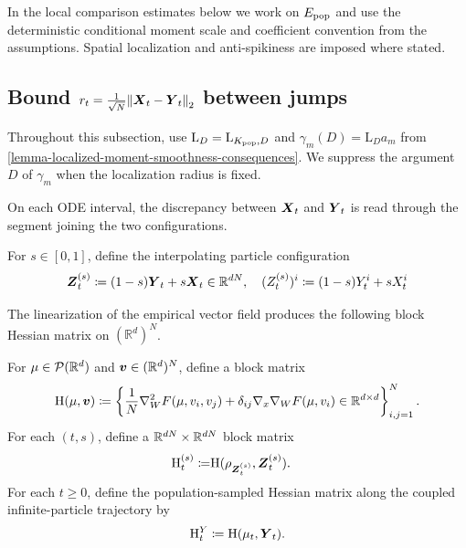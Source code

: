 

In the local comparison estimates below we work on $E_{\rm pop}$ and use the deterministic conditional moment scale and coefficient convention from the assumptions. Spatial localization and anti-spikiness are imposed where stated.

\subsection{Bound $r_t = \frac{1}{\sqrt{N}}\norm{\boldsymbol{X}_t-\boldsymbol{Y}_t}_{2}$ between jumps}
\label{subsec:general-argument-bound-r_t-ode-continuous}

Throughout this subsection, use $\mathrm L_D=\mathrm L_{K_{\rm pop},D}$
and $\gamma_m(D)=\mathrm L_Da_m$ from
\cref{lemma-localized-moment-smoothness-consequences}. We suppress the
argument $D$ of $\gamma_m$ when the localization radius is fixed.

On each ODE interval, the discrepancy between \(\boldsymbol{X}_t\) and \(\boldsymbol{Y}_t\) is read through the segment joining the two configurations.

For $s\in[0,1]$, define the interpolating particle configuration
\begin{equation}
    \boldsymbol{Z}_t^{(s)} \coloneq (1-s)\boldsymbol{Y}_t + s\boldsymbol{X}_t \in \mathbb{R}^{dN},\quad (Z_t^{(s)})^i \coloneq (1-s)Y_t^i + sX_t^i 
\end{equation}

The linearization of the empirical vector field produces the following block Hessian matrix on \((\mathbb R^d)^N\).

For $\mu \in \mathcal{P}(\mathbb{R}^d)$ and $\boldsymbol{v} \in (\mathbb{R}^{d})^{N}$, define a block matrix
\begin{equation}
    \mathrm{H}(\mu,\boldsymbol{v})\coloneq
    \left\{
    \frac{1}{N}
    \nabla_W^2 F\!\left(\mu,v_i,v_j\right)
    + \delta_{ij}\nabla_x\nabla_W F\!\left(\mu,v_i\right)\in \mathbb{R}^{d\times d}\right\}_{i,j=1}^N.
\end{equation}
For each $(t,s)$, define a $\mathbb{R}^{dN} \times \mathbb{R}^{dN}$ block matrix
\begin{align}
    \mathrm{H}_t^{(s)}
    \coloneq&
    \mathrm{H}(\rho_{\boldsymbol{Z}_t^{(s)}},\boldsymbol{Z}_t^{(s)}).
\end{align}
For each $t\ge 0$, define the population-sampled Hessian matrix along the coupled
infinite-particle trajectory by
\begin{equation}
    \mathrm{H}_t^{Y}
    \coloneq
    \mathrm{H}(\mu_t,\boldsymbol{Y}_t).
\end{equation}

